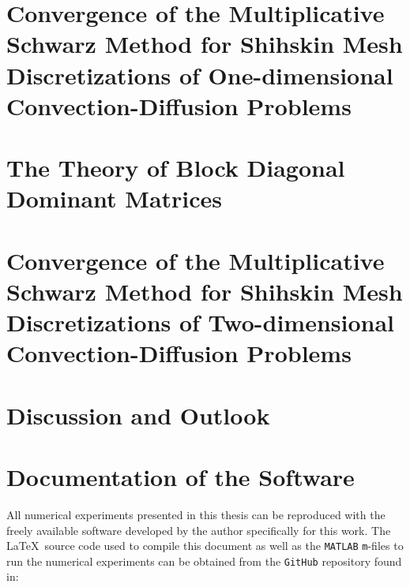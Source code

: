 \documentclass[
  twoside,
  BCOR=12mm,
  openany,
]{scrbook} %
\begin{document}
\chapter{Convergence of the Multiplicative Schwarz Method for Shihskin Mesh Discretizations of One-dimensional Convection-Diffusion Problems}
\label{ch:1D}


\chapter{The Theory of Block Diagonal Dominant Matrices}
\label{ch:BDiDo}


\chapter{Convergence of the Multiplicative Schwarz Method for Shihskin Mesh Discretizations of Two-dimensional Convection-Diffusion Problems}
\label{ch:2D}


\chapter{Discussion and Outlook}
\label{ch:end}


\ifnum{}
\appendix

% 

\chapter{Documentation of the Software}
\label{ch:matlab}
All numerical experiments presented in this thesis
can be reproduced with the freely available software developed by the author specifically for this work. The \LaTeX~source code used to compile this document as well as the \texttt{MATLAB} \texttt{m}-files to run the numerical experiments can be obtained from the \texttt{GitHub} repository found in:
\end{document}
